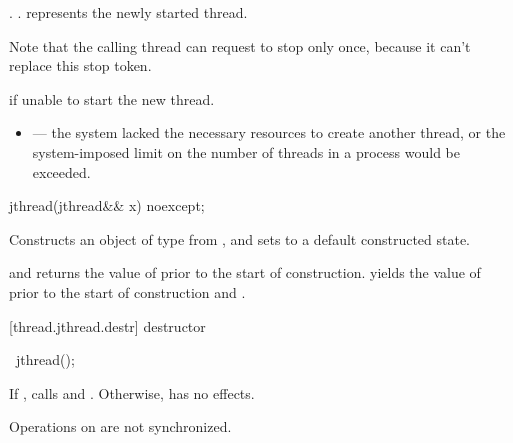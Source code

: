 \begin{itemdescr}
\pnum\postconditions {}.
{\color{diffcolor}
                     .
}
                      represents the newly started thread.
{\color{diffcolor}
\begin{note} Note that the calling thread can request to stop only once,
                because it can't replace this stop token.  \end{note}
}%

\pnum\throws {} if unable to start the new thread.

\pnum\errors
\begin{itemize}
\item {} --- the system lacked the necessary
resources to create another thread, or the system-imposed limit on the number of
threads in a process would be exceeded.
\end{itemize}
\end{itemdescr}

%
\begin{itemdecl}
jthread(jthread&& x) noexcept;
\end{itemdecl}

\begin{itemdescr}
\pnum
\effects Constructs an object of type  from , and sets
 to a default constructed state.

\pnum
\postconditions {} and  returns the
value of  prior to the start of construction.
{\color{diffcolor}
 yields the value of  prior to the start of construction
and .
}%

\end{itemdescr}

[thread.jthread.destr]{ destructor}

%
\begin{itemdecl}
~jthread();
\end{itemdecl}

{\color{diffcolor}
\begin{itemdescr}
\pnum
If , calls  and .
Otherwise, has no effects.
\begin{note} Operations on  are not synchronized. \end{note}
\end{itemdescr}
}%

